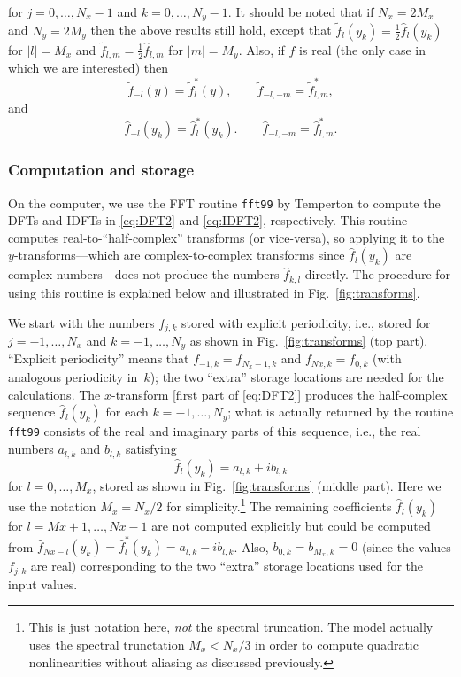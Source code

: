 \documentclass[12pt]{article}
\newcommand{\abs}[1]{\left|{#1}\right|}
\newcommand{\CC}[1]{{#1}^{*}}           %
\newcommand{\fc}[1]{\widetilde{#1}} %
\newcommand{\dfc}[1]{\widehat{#1}}  %
\newcommand{\Fc}[1]{\dfc{#1}}       %
\newcommand{\code}[1]{\texttt{#1}}
\begin{document}
for $j=0,\dots,N_x-1$ and $k=0,\dots,N_y-1$.  It should be noted that if
$N_x=2M_x$ and $N_y=2M_y$ then the above results still hold, except that
$\fc{f}_l(y_k) = \frac12\Fc{f}_l(y_k)$ for $\abs{l}=M_x$ and $\fc{f}_{l,m} =
\frac12\Fc{f}_{l,m}$ for $\abs{m}=M_y$.  Also, if $f$ is real (the only case
in which we are interested) then
\begin{equation}
   \fc{f}_{-l}(y) = \CC{\fc{f}}_l(y),
\qquad
   \fc{f}_{-l,-m} = \CC{\fc{f}}_{l,m},
\label{eq:CC}
\end{equation}
and
\begin{equation}
   \Fc{f}_{-l}(y_k) = \CC{\Fc{f}}_l(y_k).
\qquad
   \Fc{f}_{-l,-m} = \CC{\Fc{f}}_{l,m}.
\label{eq:CC:discrete}
\end{equation}

\subsubsection{Computation and storage}

On the computer, we use the FFT routine \code{fft99} by Temperton
\cite{Temperton83a,Temperton83b,Temperton83c} to compute the DFTs and IDFTs in
\eqref{eq:DFT2} and \eqref{eq:IDFT2}, respectively.  This routine computes
real-to-``half-complex'' transforms (or vice-versa), so applying it to the
$y$-transforms---which are complex-to-complex transforms since $\Fc{f}_l(y_k)$
are complex numbers---does not produce the numbers $\Fc{f}_{k,l}$ directly.
The procedure for using this routine is explained below and illustrated in 
Fig.~\ref{fig:transforms}.

We start with the numbers $f_{j,k}$ stored with explicit periodicity, i.e.,
stored for $j=-1,\dots,N_x$ and $k=-1,\dots,N_y$ as shown in
Fig.~\ref{fig:transforms} (top part).  ``Explicit periodicity'' means that
$f_{-1,k}=f_{N_x-1,k}$ and $f_{Nx,k}=f_{0,k}$ (with analogous periodicity
in~$k$); the two ``extra'' storage locations are needed for the calculations.
The $x$-transform [first part of \eqref{eq:DFT2}] produces the half-complex
sequence $\Fc{f}_{l}(y_k)$ for each $k=-1,\dots,N_y$; what is actually
returned by the routine \code{fft99} consists of the real and imaginary parts
of this sequence, i.e., the real numbers $a_{l,k}$ and $b_{l,k}$ satisfying
\begin{equation} 
   \Fc{f}_{l}(y_k) = a_{l,k} + ib_{l,k} 
\label{eq:FC2:RI}
\end{equation} 
for $l=0,\dots,M_x$, stored as shown in Fig.~\ref{fig:transforms} (middle
part).  Here we use the notation $M_x=N_x/2$ for simplicity.\footnote{This is
just notation here, \emph{not} the spectral truncation.  The model actually
uses the spectral trunctation $M_x<N_x/3$ in order to compute quadratic
nonlinearities without aliasing as discussed previously.}  The remaining
coefficients $\Fc{f}_{l}(y_k)$ for $l=Mx+1,\dots,Nx-1$ are not computed
explicitly but could be computed from $\Fc{f}_{Nx-l}(y_k) =
\CC{\Fc{f}}_{l}(y_k) = a_{l,k} - ib_{l,k}$.  Also, $b_{0,k}=b_{M_x,k}=0$
(since the values $f_{j,k}$ are real) corresponding to the two ``extra''
storage locations used for the input values.
\end{document}
